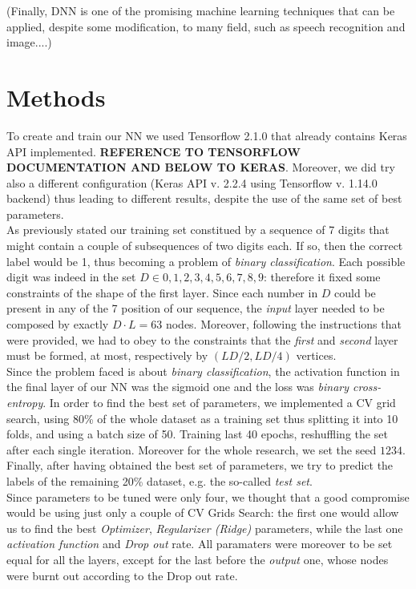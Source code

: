 \documentclass[prl,twocolumn]{revtex4-1}
\begin{document}
(Finally, DNN is one of the promising machine learning techniques that can be applied, despite some modification, to many field, such as speech recognition and image....)





\section{Methods}
To create and train our NN we used Tensorflow 2.1.0 that already contains Keras API implemented. \textbf{REFERENCE TO TENSORFLOW DOCUMENTATION AND BELOW TO KERAS}. Moreover, we did try also a different configuration (Keras API v. 2.2.4 using Tensorflow v. 1.14.0 backend) thus leading to different results, despite the use of the same set of best parameters.\\
As previously stated our training set constitued by a sequence of 7 digits that might contain a couple of subsequences of two digits each. If so, then the correct label would be 1, thus becoming a problem of \textit{binary classification}. Each possible digit was indeed in the set $D \in  {0,1,2,3,4,5,6,7,8,9}$: therefore it fixed some constraints of the shape of the first layer. Since each number in $D$ could be present in any of the 7 position of our sequence, the \textit{input} layer needed to be composed by exactly $D \cdot L=63$ nodes. Moreover, following the instructions that were provided, we had to obey to the constraints that the \textit{first} and \textit{second} layer must be formed, at most,  respectively by $(LD/2, LD/4)$ vertices.\\
Since the problem faced is about \textit{binary classification}, the activation function in the final layer of our NN was the sigmoid one and the loss was \textit{binary cross-entropy}.
In order to find the best set of parameters, we implemented a CV grid search, using 80\% of the whole dataset as a training set thus splitting it into 10 folds, and using a batch size of 50. Training last 40 epochs, reshuffling the set after each single iteration. Moreover for the whole research, we set the seed $1234$. Finally, after having obtained the best set of parameters, we try to predict the labels of the remaining 20\% dataset, e.g. the so-called \textit{test set}.\\
Since parameters to be tuned were only four, we thought that a good compromise would be using just only a couple of CV Grids Search: the first one would allow us to find the best \textit{Optimizer}, \textit{Regularizer (Ridge)} parameters, while the last one \textit{activation function} and \textit{Drop out} rate. All paramaters were moreover to be set equal for all the layers, except for the last before the \textit{output} one, whose nodes were burnt out according to the Drop out rate.\\
\end{document}
